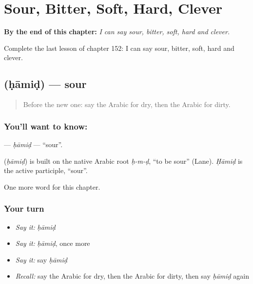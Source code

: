 
\chapter{Sour, Bitter, Soft, Hard, Clever}
\label{ch:ar-sour-bitter-soft-hard-clever}

\begin{chapteropening}
\textbf{By the end of this chapter:} \emph{I can say sour, bitter, soft, hard and clever.}

Complete the last lesson of chapter 152: I can say sour, bitter, soft, hard and clever.
\end{chapteropening}

\section[\texorpdfstring{\ar{حامض} (ḥāmiḍ)}{حامض (ḥāmiḍ)}]{ (ḥāmiḍ) — sour}

\label{lesson:AR-C152-hamid}



\begin{quote}
Before the new one: say the Arabic for dry, then the Arabic for dirty.
\end{quote}

\subsection*{You'll want to know: }
\textbf{} — \emph{ḥāmiḍ} — \textquotedblleft{}sour\textquotedblright{}.

\begin{cousinweb}
\textbf{} (\emph{ḥāmiḍ}) is built on the native Arabic root \emph{ḥ-m-ḍ}, \textquotedblleft{}to be sour\textquotedblright{} (Lane). \emph{Ḥāmiḍ} is the active participle, \textquotedblleft{}sour\textquotedblright{}.
\end{cousinweb}

\begin{grammarlens}[title={What you've built}]
One more word for this chapter.
\end{grammarlens}

\subsection*{Your turn}
\begin{itemize}
\raggedright
  \item \emph{Say it:} \emph{ḥāmiḍ}
  \item \emph{Say it:} \emph{ḥāmiḍ}, once more
  \item \emph{Say it:} say \emph{ḥāmiḍ}
  \item \emph{Recall:} say the Arabic for dry, then the Arabic for dirty, then say \emph{ḥāmiḍ} again
\end{itemize}

